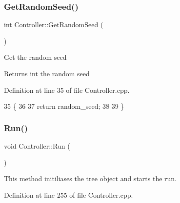 \subsubsection{\texorpdfstring{Get\+Random\+Seed()}{GetRandomSeed()}}
{\footnotesize\ttfamily int Controller\+::\+Get\+Random\+Seed (\begin{DoxyParamCaption}{ }\end{DoxyParamCaption})}

Get the random seed \begin{DoxyReturn}{Returns}
int the random seed 
\end{DoxyReturn}


Definition at line 35 of file Controller.\+cpp.


\begin{DoxyCode}
35                               \{
36   
37   \textcolor{keywordflow}{return} random\_seed;
38   
39 \}
\end{DoxyCode}
\mbox{\label{classController_a17abb2cec6c0109e9b2df3cdc082eaad}} 
\subsubsection{\texorpdfstring{Run()}{Run()}}
{\footnotesize\ttfamily void Controller\+::\+Run (\begin{DoxyParamCaption}{ }\end{DoxyParamCaption})}

This method initiliases the tree object and starts the run. 

Definition at line 255 of file Controller.\+cpp.


